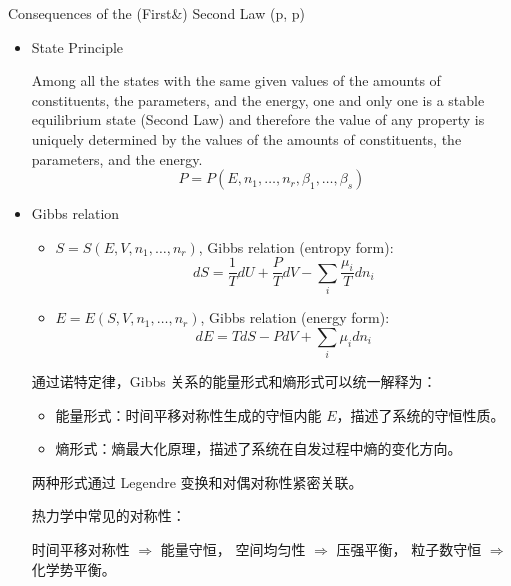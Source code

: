 \begin{thm}\label{cfsl3}
    Consequences of the (First\&) Second Law (p\pageref{cfsl1}\;,\; p\pageref{cfsl2})
\begin{itemize}
    \item State Principle
    
    Among all the states with the same given values of the amounts of constituents, the parameters, 
    and the energy, one and only one is a stable equilibrium state (Second Law) and 
    therefore the value of any property is uniquely determined by the values of 
    the amounts of constituents, the parameters, and the energy.
    \[
    P = P(E, n_1, \ldots, n_r, \beta_1, \ldots, \beta_s)
    \] 
    \item Gibbs relation
    \begin{itemize}
        \item 
        \(
        S = S(E, V, n_1, \dots, n_r)
        \),        
        Gibbs relation (entropy form):
\[
dS = \frac{1}{T} dU + \frac{P}{T} dV - \sum_i \frac{\mu_i}{T} dn_i
\]
        \item 
        \(
        E = E(S, V, n_1, \dots, n_r)
        \),        
        Gibbs relation (energy form):
        \[
        dE = T dS - P dV + \sum_i \mu_i dn_i
        \]
    \end{itemize}
    \begin{add}
        通过诺特定律，Gibbs 关系的能量形式和熵形式可以统一解释为：
\begin{itemize}
    \item 能量形式：时间平移对称性生成的守恒内能 \(E\)，描述了系统的守恒性质。
    \item 熵形式：熵最大化原理，描述了系统在自发过程中熵的变化方向。
\end{itemize}
        两种形式通过 Legendre 变换和对偶对称性紧密关联。
    \begin{zhu}
        热力学中常见的对称性：

    时间平移对称性 $\Rightarrow$ 能量守恒，
    空间均匀性 $\Rightarrow$ 压强平衡，
    粒子数守恒 $\Rightarrow$ 化学势平衡。
    \end{zhu}
    \end{add}
\end{itemize}
\end{thm}
